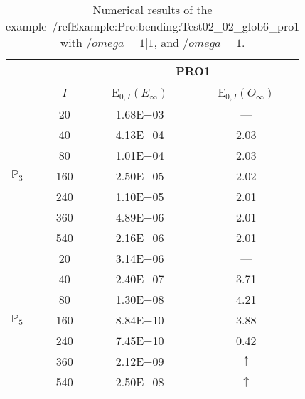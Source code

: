 \begin{table}[H]
\caption{Numerical results of the example~/ref{Example:Pro:bending:Test02_02_glob6_pro1} with $/omega=1|1$, and $/omega=1$.}
\setlength{\tabcolsep}{5pt}
\centering
\begin{tabular}{@{}l c c c@{}}
\toprule
 &  & \multicolumn{2}{c}{PRO1}\\
\midrule
 & $I$ & E$_{0,I}(E_{\infty})$ & E$_{0,I}(O_{\infty})$\\
\midrule
\multirow{7}{*}{$\mathbb{P}_{3}$}
 & 20 & 1.68E$-$03 & ---\\
 & 40 & 4.13E$-$04 & 2.03\\
 & 80 & 1.01E$-$04 & 2.03\\
 & 160 & 2.50E$-$05 & 2.02\\
 & 240 & 1.10E$-$05 & 2.01\\
 & 360 & 4.89E$-$06 & 2.01\\
 & 540 & 2.16E$-$06 & 2.01\\
\midrule
\multirow{7}{*}{$\mathbb{P}_{5}$}
 & 20 & 3.14E$-$06 & ---\\
 & 40 & 2.40E$-$07 & 3.71\\
 & 80 & 1.30E$-$08 & 4.21\\
 & 160 & 8.84E$-$10 & 3.88\\
 & 240 & 7.45E$-$10 & 0.42\\
 & 360 & 2.12E$-$09 & $\uparrow$\\
 & 540 & 2.50E$-$08 & $\uparrow$\\
\bottomrule
\end{tabular}
\label{Table:PRO:test_02_02_test21_pro1}
\end{table}
